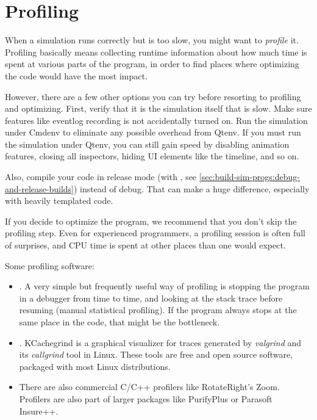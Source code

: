\section{Profiling}
\label{sec:run-sim:profiling}

When a simulation runs correctly but is too slow, you might want to
\textit{profile} it. Profiling basically means collecting runtime
information about how much time is spent at various parts of the
program, in order to find places where optimizing the code would have
the most impact.

However, there are a few other options you can try before resorting to profiling
and optimizing. First, verify that it  is the simulation itself that is slow.
Make sure features like eventlog recording is not accidentally turned on. Run
the simulation under Cmdenv to eliminate any possible overhead from Qtenv.
If you must run the simulation under Qtenv, you can still gain speed by
disabling animation features, closing all inspectors, hiding UI elements like
the timeline, and so on.

Also, compile your code in release mode (with , see
\ref{sec:build-sim-progs:debug-and-release-builds}) instead of debug. That
can make a huge difference, especially with heavily templated code.

\begin{hint}
If you decide to optimize the program, we recommend that you don't skip the
profiling step. Even for experienced programmers, a profiling session is often
full of surprises, and CPU time is spent at other places than one would
expect.
\end{hint}

Some profiling software:

\begin{itemize}
  \item {}. A very simple but frequently useful way of profiling is
        stopping the program in a debugger from time to time, and looking at the
        stack trace before resuming (manual statistical profiling). If
        the program always stops at the same place in the code, that might be
        the bottleneck.
  \item {}. KCachegrind is a graphical visualizer
        for traces generated by \textit{valgrind} and its \textit{callgrind}
        tool in Linux. These tools are free and open source software,
        packaged with most Linux distributions.
  \item There are also commercial C/C++ profilers like RotateRight's Zoom.
        Profilers are also part of larger packages like PurifyPlus or
        Parasoft Insure++.
\end{itemize}


